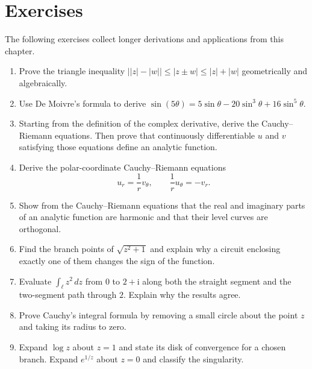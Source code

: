 \section*{Exercises}
The following exercises collect longer derivations and applications from this chapter.

\renewcommand{\theenumi}{\thechapter.\arabic{enumi}}
\renewcommand{\labelenumi}{\theenumi.}
\begin{enumerate}
    \item Prove the triangle inequality $\bigl||z|-|w|\bigr|\leq|z\pm w|\leq|z|+|w|$ geometrically and algebraically.

    \item Use De Moivre's formula to derive $\sin(5\theta)=5\sin\theta-20\sin^3\theta+16\sin^5\theta$.

    \item Starting from the definition of the complex derivative, derive the Cauchy--Riemann equations. Then prove that continuously differentiable $u$ and $v$ satisfying those equations define an analytic function.

    \item Derive the polar-coordinate Cauchy--Riemann equations
    \begin{equation*}
    u_r=\frac{1}{r}v_\theta,\qquad \frac{1}{r}u_\theta=-v_r.
    \end{equation*}

    \item Show from the Cauchy--Riemann equations that the real and imaginary parts of an analytic function are harmonic and that their level curves are orthogonal.

    \item Find the branch points of $\sqrt{z^2+1}$ and explain why a circuit enclosing exactly one of them changes the sign of the function.

    \item Evaluate $\int_\ell z^2\,dz$ from $0$ to $2+\mathrm{i}$ along both the straight segment and the two-segment path through $2$. Explain why the results agree.

    \item Prove Cauchy's integral formula by removing a small circle about the point $z$ and taking its radius to zero.

    \item Expand $\log z$ about $z=1$ and state its disk of convergence for a chosen branch. Expand $e^{1/z}$ about $z=0$ and classify the singularity.


\end{enumerate}

